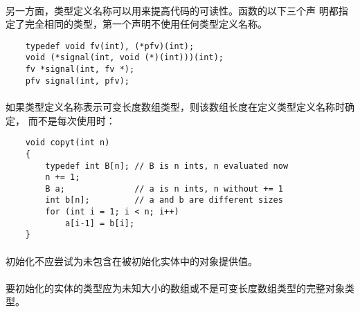 {\paragraph{}
\ex 另一方面，类型定义名称可以用来提高代码的可读性。函数的以下三个声
明都指定了完全相同的类型，第一个声明不使用任何类型定义名称。
\begin{lstlisting}
    typedef void fv(int), (*pfv)(int);
    void (*signal(int, void (*)(int)))(int);
    fv *signal(int, fv *);
    pfv signal(int, pfv);
\end{lstlisting}

\paragraph{}
\ex 如果类型定义名称表示可变长度数组类型，则该数组长度在定义类型定义名称时确定，
而不是每次使用时：
\begin{lstlisting}
    void copyt(int n)
    {
        typedef int B[n]; // B is n ints, n evaluated now
        n += 1;
        B a;              // a is n ints, n without += 1
        int b[n];         // a and b are different sizes
        for (int i = 1; i < n; i++)
            a[i-1] = b[i];
    }
\end{lstlisting}

\syntax
\paragraph{}

\constraint
\paragraph{}
初始化不应尝试为未包含在被初始化实体中的对象提供值。

\paragraph{}
要初始化的实体的类型应为未知大小的数组或不是可变长度数组类型的完整对象类型。

}

